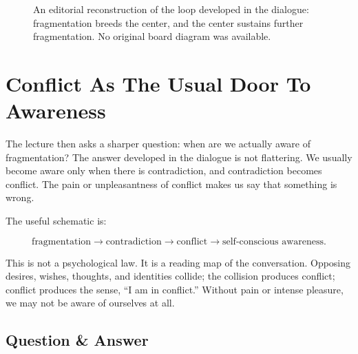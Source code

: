 \begin{figure}
\centering
{}
\caption{An editorial reconstruction of the loop developed in the dialogue: fragmentation breeds the center, and the center sustains further fragmentation. No original board diagram was available.}
\end{figure}

\section{Conflict As The Usual Door To Awareness}

The lecture then asks a sharper question: when are we actually aware of fragmentation? The answer developed in the dialogue is not flattering. We usually become aware only when there is contradiction, and contradiction becomes conflict. The pain or unpleasantness of conflict makes us say that something is wrong.

The useful schematic is:

\begin{equation}
\text{fragmentation}
\longrightarrow
\text{contradiction}
\longrightarrow
\text{conflict}
\longrightarrow
\text{self-conscious awareness}.
\end{equation}

This is not a psychological law. It is a reading map of the conversation. Opposing desires, wishes, thoughts, and identities collide; the collision produces conflict; conflict produces the sense, ``I am in conflict.'' Without pain or intense pleasure, we may not be aware of ourselves at all.

\subsection{Question \& Answer}

